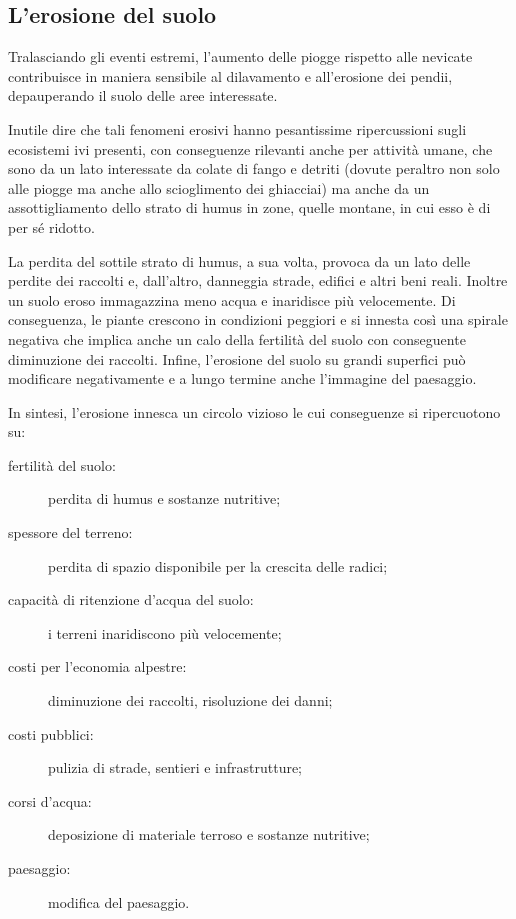 \documentclass[14pt,a4paper]{article}
\begin{document}
	\subsection{L'erosione del suolo}
	Tralasciando gli eventi estremi, l'aumento delle piogge rispetto alle nevicate contribuisce in maniera sensibile al dilavamento e all'erosione dei pendii, depauperando il suolo delle aree interessate.
	
	Inutile dire che tali fenomeni erosivi hanno pesantissime ripercussioni sugli ecosistemi ivi presenti, con conseguenze rilevanti anche per attività umane, che sono da un lato interessate da colate di fango e detriti (dovute peraltro non solo alle piogge ma anche allo scioglimento dei ghiacciai) ma anche da un assottigliamento dello strato di humus in zone, quelle montane, in cui esso è di per sé ridotto.
	
	La perdita del sottile strato di humus, a sua volta, provoca da un lato delle perdite dei raccolti e, dall'altro, danneggia strade, edifici e altri beni reali. Inoltre un suolo eroso immagazzina meno acqua e inaridisce più velocemente. Di conseguenza, le piante crescono in condizioni peggiori e si innesta così una spirale negativa che implica anche un calo della fertilità del suolo con conseguente diminuzione dei raccolti. Infine, l'erosione del suolo su grandi superfici può modificare negativamente e a lungo termine anche l'immagine del paesaggio.
	 	
	In sintesi, l'erosione innesca un circolo vizioso le cui conseguenze si ripercuotono su:
	
	\begin{description}
		\item[fertilità del suolo:]
		perdita di humus e sostanze nutritive;
		\item[spessore del terreno:]
		perdita di spazio disponibile per la crescita delle radici;
		\item[capacità di ritenzione d’acqua del suolo:]
		i terreni inaridiscono più velocemente;
		\item[costi per l'economia alpestre:]
		diminuzione dei raccolti, risoluzione dei danni;
		\item[costi pubblici:]
		pulizia di strade, sentieri e infrastrutture;
		\item[corsi d'acqua:]
		deposizione di materiale terroso e sostanze nutritive;
		\item[paesaggio:]
		modifica del paesaggio.
	\end{description}
		
\end{document}
